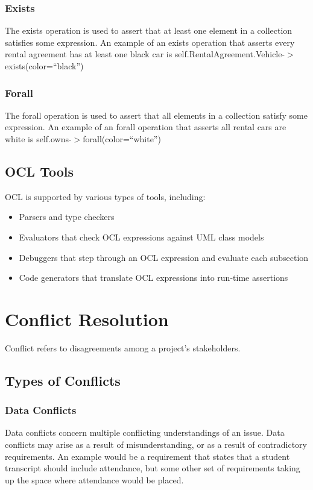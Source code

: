 \documentclass[12pt,titlepage]{article}
\let\stdsection\section
\renewcommand\section{\clearpage\stdsection}
\begin{document}
      \subsubsection{Exists}
        The exists operation is used to assert that at least one element in a collection satisfies some expression. An example of an exists
        operation that asserts every rental agreement has at least one black car is self.RentalAgreement.Vehicle-$>$exists(color=``black'')

      \subsubsection{Forall}
        The forall operation is used to assert that all elements in a collection satisfy some expression. An example of an forall operation
        that asserts all rental cars are white is self.owns-$>$forall(color=``white'')

    \subsection{OCL Tools}
      OCL is supported by various types of tools, including:
      \begin{itemize}
        \item Parsers and type checkers
        \item Evaluators that check OCL expressions against UML class models
        \item Debuggers that step through an OCL expression and evaluate each subsection
        \item Code generators that translate OCL expressions into run-time assertions
      \end{itemize}

  \section{Conflict Resolution}
    Conflict refers to disagreements among a project's stakeholders.

    \subsection{Types of Conflicts}

      \subsubsection{Data Conflicts}
        Data conflicts concern multiple conflicting understandings of an issue. Data conflicts may arise as a result of misunderstanding, or
        as a result of contradictory requirements. An example would be a requirement that states that a student transcript should
        include attendance, but some other set of requirements taking up the space where attendance would be placed.
\end{document}
